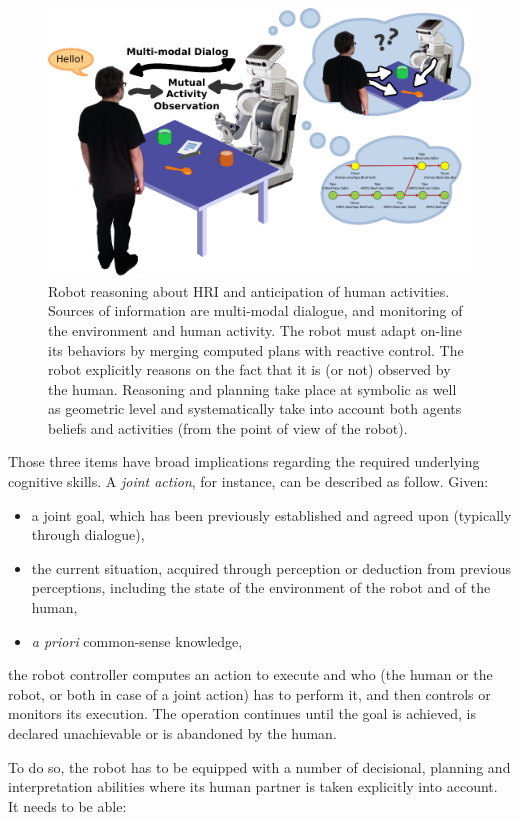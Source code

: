 \documentclass[preprint,3p,times]{elsarticle}
\begin{document}
\begin{figure}[htb]
\centering
\includegraphics[width=0.6\columnwidth]{grounding_robot.pdf}
\caption{Robot reasoning about HRI and anticipation of human activities.
  Sources of information are multi-modal dialogue, and monitoring of the
  environment and human activity. The robot must adapt on-line its behaviors
  by merging computed plans with reactive control. The robot explicitly reasons
  on the fact that it is (or not) observed by the human. Reasoning and planning
  take place at symbolic as well as geometric level and systematically take
  into account both agents beliefs and activities (from the point of view of
  the robot).}

\label{fig:hri-dec}
\end{figure}

Those three items have broad implications regarding the required underlying
cognitive skills.  A \emph{joint action}, for instance, can be described as
follow. Given:

\begin {itemize}
\item a joint goal, which has been previously established and agreed
  upon (typically through dialogue),
\item the current situation, acquired through perception or
  deduction from previous perceptions, including the state of the
  environment of the robot and of the human,
\item {\it a priori} common-sense knowledge,
\end {itemize}

the robot controller computes an action to execute and who (the 
human or the robot, or both in case of a joint action) has to perform
it, and then controls or monitors its execution. The operation
continues until the goal is achieved, is declared unachievable or is
abandoned by the human.

To do so, the robot has to be equipped with a number of decisional, planning
and interpretation abilities where its human partner is taken explicitly into
account. It needs to be able:
\end{document}
